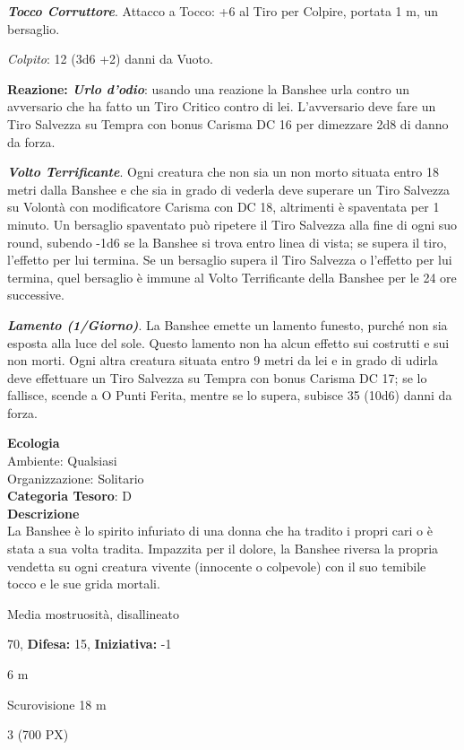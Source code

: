 \begin{multicols}{2}
{\emph{\textbf{Tocco Corruttore}}. Attacco a Tocco: +6 al Tiro per Colpire, portata 1 m, un bersaglio.

\emph{Colpito}: 12 (3d6 +2) danni da Vuoto.

\textbf{Reazione: \emph{Urlo d'odio}}: usando una reazione la Banshee urla contro un avversario che ha fatto un Tiro Critico contro di lei. L'avversario deve fare un Tiro Salvezza su Tempra con bonus Carisma DC 16 per dimezzare 2d8 di danno da forza.

\emph{\textbf{Volto Terrificante}}. Ogni creatura che non sia un non morto situata entro 18 metri dalla Banshee e che sia in grado di vederla deve superare un Tiro Salvezza su Volontà con modificatore Carisma con DC 18, altrimenti è spaventata per 1 minuto. Un bersaglio spaventato può ripetere il Tiro Salvezza alla fine di ogni suo round, subendo -1d6 se la Banshee si trova entro linea di vista; se supera il tiro, l'effetto per lui termina. Se un bersaglio supera il Tiro Salvezza o l'effetto per lui termina, quel bersaglio è immune al Volto Terrificante della Banshee per le 24 ore successive.

\emph{\textbf{Lamento (1/Giorno)}}. La Banshee emette un lamento funesto, purché non sia esposta alla luce del sole. Questo lamento non ha alcun effetto sui costrutti e sui non morti. Ogni altra creatura situata entro 9 metri da lei e in grado di udirla deve effettuare un Tiro Salvezza su Tempra con bonus Carisma DC 17; se lo fallisce, scende a O Punti Ferita, mentre se lo supera, subisce 35 (10d6) danni da forza.

\textbf{Ecologia}\\
Ambiente: Qualsiasi\\
Organizzazione: Solitario\\
\textbf{Categoria Tesoro}: D\\
\textbf{Descrizione}\\
La Banshee è lo spirito infuriato di una donna che ha tradito i propri cari o è stata a sua volta tradita. Impazzita per il dolore, la Banshee riversa la propria vendetta su ogni creatura vivente (innocente o colpevole) con il suo temibile tocco e le sue grida mortali.

\noindent
\begin{description}[noitemsep, topsep=0pt, parsep=0pt, partopsep=0pt, leftmargin=0cm, labelwidth=2.2cm]
	\item[\textbf{Taglia/Tipo:}] Media mostruosità, disallineato
	\item[\textbf{Caratt.:}] 
	\item[\textbf{Punti Ferita:}] 70,  \textbf{Difesa:} 15,  \textbf{Iniziativa:} -1
	\item[\textbf{Movimento:}] 6 m
	\item[\textbf{Tiri Salvez.:}] 
	\item[\textbf{Sensi:}] Scurovisione 18 m
	\item[\textbf{Sfida:}] 3 (700 PX)\smallskip
\end{description}

}
\end{multicols}
